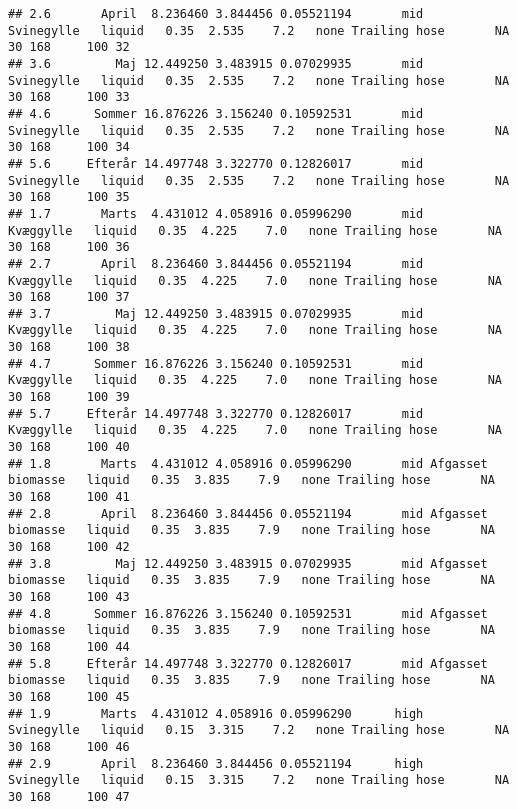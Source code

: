 \documentclass[
  landscape]{article}
\begin{document}
\begin{verbatim}
## 2.6       April  8.236460 3.844456 0.05521194       mid        Svinegylle   liquid   0.35  2.535    7.2   none Trailing hose       NA          30 168     100 32
## 3.6         Maj 12.449250 3.483915 0.07029935       mid        Svinegylle   liquid   0.35  2.535    7.2   none Trailing hose       NA          30 168     100 33
## 4.6      Sommer 16.876226 3.156240 0.10592531       mid        Svinegylle   liquid   0.35  2.535    7.2   none Trailing hose       NA          30 168     100 34
## 5.6     Efterår 14.497748 3.322770 0.12826017       mid        Svinegylle   liquid   0.35  2.535    7.2   none Trailing hose       NA          30 168     100 35
## 1.7       Marts  4.431012 4.058916 0.05996290       mid         Kvæggylle   liquid   0.35  4.225    7.0   none Trailing hose       NA          30 168     100 36
## 2.7       April  8.236460 3.844456 0.05521194       mid         Kvæggylle   liquid   0.35  4.225    7.0   none Trailing hose       NA          30 168     100 37
## 3.7         Maj 12.449250 3.483915 0.07029935       mid         Kvæggylle   liquid   0.35  4.225    7.0   none Trailing hose       NA          30 168     100 38
## 4.7      Sommer 16.876226 3.156240 0.10592531       mid         Kvæggylle   liquid   0.35  4.225    7.0   none Trailing hose       NA          30 168     100 39
## 5.7     Efterår 14.497748 3.322770 0.12826017       mid         Kvæggylle   liquid   0.35  4.225    7.0   none Trailing hose       NA          30 168     100 40
## 1.8       Marts  4.431012 4.058916 0.05996290       mid Afgasset biomasse   liquid   0.35  3.835    7.9   none Trailing hose       NA          30 168     100 41
## 2.8       April  8.236460 3.844456 0.05521194       mid Afgasset biomasse   liquid   0.35  3.835    7.9   none Trailing hose       NA          30 168     100 42
## 3.8         Maj 12.449250 3.483915 0.07029935       mid Afgasset biomasse   liquid   0.35  3.835    7.9   none Trailing hose       NA          30 168     100 43
## 4.8      Sommer 16.876226 3.156240 0.10592531       mid Afgasset biomasse   liquid   0.35  3.835    7.9   none Trailing hose       NA          30 168     100 44
## 5.8     Efterår 14.497748 3.322770 0.12826017       mid Afgasset biomasse   liquid   0.35  3.835    7.9   none Trailing hose       NA          30 168     100 45
## 1.9       Marts  4.431012 4.058916 0.05996290      high        Svinegylle   liquid   0.15  3.315    7.2   none Trailing hose       NA          30 168     100 46
## 2.9       April  8.236460 3.844456 0.05521194      high        Svinegylle   liquid   0.15  3.315    7.2   none Trailing hose       NA          30 168     100 47

\end{verbatim}
\end{document}
